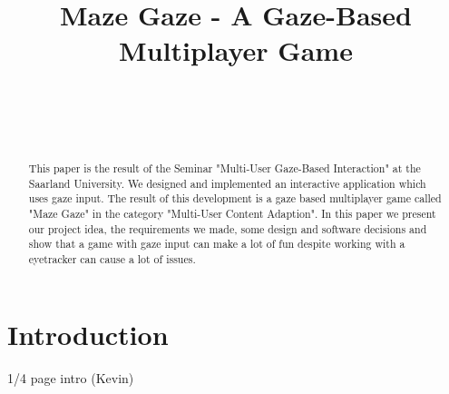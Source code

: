 \documentclass{sigchi}
\def\plaintitle{Maze Gaze - A Gaze-Based Multiplayer Game}
\def\plainkeywords{eye-tracking; gaze-based interaction; multi-user interaction; human computer interaction;}
\begin{document}
\title{\plaintitle}

\author{%
  \\
  \\
  \\
}

\maketitle

\begin{abstract}
This paper is the result of the Seminar "Multi-User Gaze-Based Interaction" at the Saarland University. We designed and implemented an interactive application which uses gaze input. The result of this development is a gaze based multiplayer game called "Maze Gaze" in the category "Multi-User Content Adaption". In this paper we present our project idea, the requirements we made, some design and software decisions and show that a game with gaze input can make a lot of fun despite working with a eyetracker can cause a lot of issues.
\end{abstract}


\section{Introduction}
1/4 page intro (Kevin)
\end{document}
